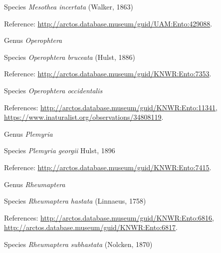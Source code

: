 \documentclass[9pt, article]{memoir}
\begin{document}
\begin{multicols}{2}
\vspace{6pt}\noindent\hspace{36pt}Species \textit{Mesothea incertata} (Walker, 1863)


\vspace{6pt}Reference: 
\url{http://arctos.database.museum/guid/UAM:Ento:429088}.

\vspace{6pt}\noindent\hspace{30pt}Genus \textit{Operophtera}


\vspace{6pt}\noindent\hspace{36pt}Species \textit{Operophtera bruceata} (Hulst, 1886)


\vspace{6pt}Reference: 
\url{http://arctos.database.museum/guid/KNWR:Ento:7353}.

\vspace{6pt}\noindent\hspace{36pt}Species \textit{Operophtera occidentalis}


\vspace{6pt}References: 
\url{http://arctos.database.museum/guid/KNWR:Ento:11341}, 
\url{https://www.inaturalist.org/observations/34808119}.

\vspace{6pt}\noindent\hspace{30pt}Genus \textit{Plemyria}


\vspace{6pt}\noindent\hspace{36pt}Species \textit{Plemyria georgii} Hulst, 1896


\vspace{6pt}Reference: 
\url{http://arctos.database.museum/guid/KNWR:Ento:7415}.

\vspace{6pt}\noindent\hspace{30pt}Genus \textit{Rheumaptera}


\vspace{6pt}\noindent\hspace{36pt}Species \textit{Rheumaptera hastata} (Linnaeus, 1758)


\vspace{6pt}References: 
\url{http://arctos.database.museum/guid/KNWR:Ento:6816}, 
\url{http://arctos.database.museum/guid/KNWR:Ento:6817}.

\vspace{6pt}\noindent\hspace{36pt}Species \textit{Rheumaptera subhastata} (Nolcken, 1870)



\end{multicols}
\end{document}
